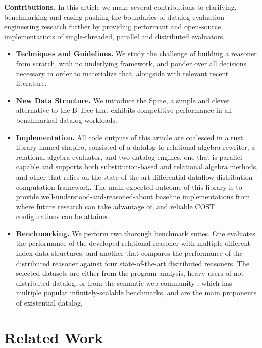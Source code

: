 \textbf{Contributions.} In this article we make several contributions to clarifying, benchmarking
and easing pushing the boundaries of datalog evaluation engineering research further by
providing performant and open-source implementations of single-threaded, parallel and distributed evaluators.

\begin{itemize}
	\item \textbf{Techniques and Guidelines.} We study the challenge of building a reasoner from scratch,
	      with no underlying framework, and ponder over all decisions necessary in order to materialize that,
	      alongside with relevant recent literature.
	\item \textbf{New Data Structure.} We introduce the Spine, a simple and clever alternative to the B-Tree that
	      exhibits competitive performance in all benchmarked datalog workloads.
	\item \textbf{Implementation.} All code outputs of this article are coalesced in a rust library named shapiro,
	      consisted of a datalog to relational algebra rewriter, a relational algebra evaluator, and two datalog engines,
	      one that is parallel-capable and supports both substitution-based and relational algebra methods, and other that
	      relies on the state-of-the-art differential dataflow\cite{differential_dataflow} distribution computation framework.
	      The main expected outcome of this library is to provide well-understood-and-reasoned-about baseline implementations
	      from where future research can take advantage of, and reliable COST configurations can be attained.
	\item \textbf{Benchmarking.} We perform two thorough benchmark suites. One evaluates the performance of the developed
	      relational reasoner with multiple different index data structures, and another that compares the performance
	      of the distributed reasoner against four state-of-the-art distributed reasoners. The selected datasets are either
	      from the program analysis, heavy users of not-distributed datalog, or from the semantic web community
	      , which has multiple popular infinitely-scalable benchmarks, and are the main proponents of existential datalog.
\end{itemize}

\section{Related Work}

